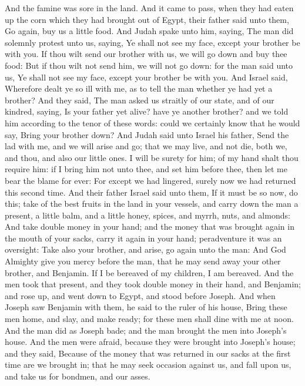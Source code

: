 \begin{biblechapter} %
 And the famine was sore in the land.
\verse And it came to pass, when they had eaten up the corn which they had brought out of Egypt, their father said unto them, Go again, buy us a little food.
\verse And Judah spake unto him, saying, The man did solemnly protest unto us, saying, Ye shall not see my face, except your brother be with you.
\verse If thou wilt send our brother with us, we will go down and buy thee food:
\verse But if thou wilt not send him, we will not go down: for the man said unto us, Ye shall not see my face, except your brother be with you.
\verse And Israel said, Wherefore dealt ye so ill with me, as to tell the man whether ye had yet a brother?
\verse And they said, The man asked us straitly of our state, and of our kindred, saying, Is your father yet alive? have ye another brother? and we told him according to the tenor of these words: could we certainly know that he would say, Bring your brother down?
\verse And Judah said unto Israel his father, Send the lad with me, and we will arise and go; that we may live, and not die, both we, and thou, and also our little ones.
\verse I will be surety for him; of my hand shalt thou require him: if I bring him not unto thee, and set him before thee, then let me bear the blame for ever:
\verse For except we had lingered, surely now we had returned this second time.
\verse And their father Israel said unto them, If it must be so now, do this; take of the best fruits in the land in your vessels, and carry down the man a present, a little balm, and a little honey, spices, and myrrh, nuts, and almonds:
\verse And take double money in your hand; and the money that was brought again in the mouth of your sacks, carry it again in your hand; peradventure it was an oversight:
\verse Take also your brother, and arise, go again unto the man:
\verse And God Almighty give you mercy before the man, that he may send away your other brother, and Benjamin. If I be bereaved of my children, I am bereaved.
\verse And the men took that present, and they took double money in their hand, and Benjamin; and rose up, and went down to Egypt, and stood before Joseph.
\verse And when Joseph saw Benjamin with them, he said to the ruler of his house, Bring these men home, and slay, and make ready; for these men shall dine with me at noon.
\verse And the man did as Joseph bade; and the man brought the men into Joseph's house.
\verse And the men were afraid, because they were brought into Joseph's house; and they said, Because of the money that was returned in our sacks at the first time are we brought in; that he may seek occasion against us, and fall upon us, and take us for bondmen, and our asses.

\end{biblechapter}
